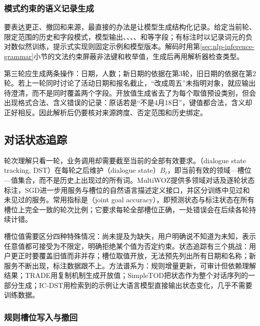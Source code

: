 \subsubsection{模式约束的语义记录生成}
\label{sec:nlp-dialogue-semantic-record}

要表达更正、撤回和来源，最直接的办法是让模型生成结构化记录。给定当前轮、限定范围的历史和字段模式，模型输出、、、、和等字段；有标注时以记录词元的负对数似然训练，提示式实现则固定示例和模型版本。解码时用第\ref{sec:nlp-inference-grammar}小节的文法约束屏蔽非法键和枚举值，生成后再用解析器检查类型。

第三轮应生成两条操作：日期，人数；新日期的依据在第3轮，旧日期的依据在第2轮。若上一轮同时讨论了活动日期和报名截止，“改成周五”未指明对象，就应输出待澄清，而不是同时覆盖两个字段。开放值生成省去了为每个取值预设类别，但会出现格式合法、含义错误的记录：原话若是“不是4月18日”，键值都合法，含义却正好相反。因此解析后仍要核对来源跨度、否定范围和历史绑定。

\subsection{对话状态追踪}
\label{sec:nlp-dialogue-state}

轮次理解只看一轮，业务调用却需要截至当前的全部有效要求。（dialogue state tracking, DST）在每轮之后维护（dialogue state）$B_t$，即当前有效的领域—槽位—值集合，而不是历史上出现过的所有词。MultiWOZ提供多领域对话及逐轮状态标注\cite{budzianowski2018multiwoz}，SGD进一步用服务与槽位的自然语言描述定义接口，并区分训练中见过和未见过的服务。常用指标是（joint goal accuracy），即预测状态与标注状态在所有槽位上完全一致的轮次比例；它要求每轮全部槽位正确，一处错误会在后续各轮持续计错。

槽位值需要区分四种特殊情况：尚未提及为缺失，用户明确说不知道为未知，表示任意值都可接受为不限定，明确拒绝某个值为否定约束。状态追踪有三个挑战：用户更正时要覆盖旧值而非并存；槽位取值开放，无法预先列出所有日期和名称；新服务不断出现，标注数据跟不上。方法谱系为：规则增量更新，可审计但依赖理解结果；TRADE用复制机制生成开放值；SimpleTOD把状态作为整个对话序列的一部分生成；IC-DST用检索到的示例让大语言模型直接输出状态变化，几乎不需要训练数据。

\subsubsection{规则槽位写入与撤回}
\label{sec:nlp-dialogue-state-rule}

